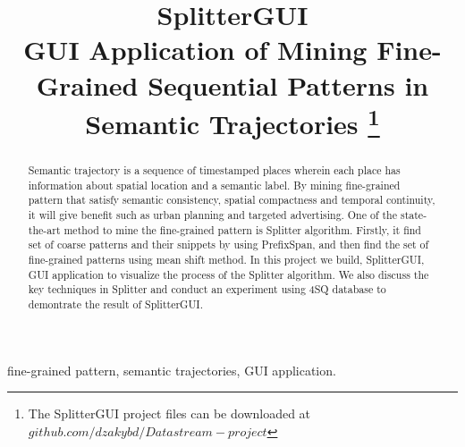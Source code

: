 \documentclass[conference]{IEEEtran}
\begin{document}
\title{SplitterGUI\\
{\large GUI Application of Mining Fine-Grained Sequential Patterns in Semantic Trajectories}
\thanks{The SplitterGUI project files can be downloaded at
$github.com/dzakybd/Datastream-project$}
}

\author{
}

\maketitle

\begin{abstract}
Semantic trajectory is a sequence of timestamped places wherein each place has information about spatial location and a semantic label. By mining fine-grained pattern that satisfy semantic consistency, spatial compactness and temporal continuity, it will give benefit such as urban planning and targeted advertising. One of the state-the-art method to mine the fine-grained pattern is Splitter algorithm. Firstly, it find set of coarse patterns and their snippets by using PrefixSpan, and then find the set of fine-grained patterns using mean shift method. In this project we build, SplitterGUI, GUI application to visualize the process of the Splitter algorithm. We also discuss the key techniques in Splitter and conduct an experiment using 4SQ database to demontrate the result of SplitterGUI.

\end{abstract}

\begin{IEEEkeywords}
fine-grained pattern, semantic trajectories, GUI application.
\end{IEEEkeywords}
\end{document}
